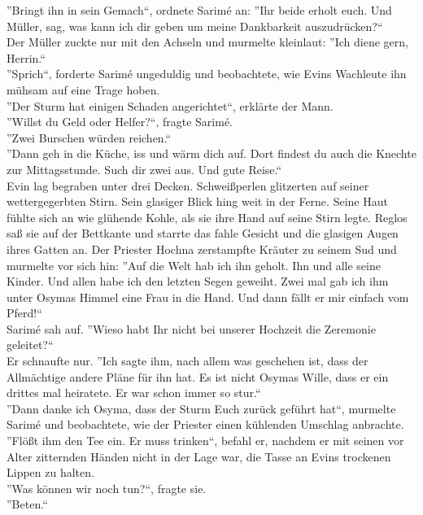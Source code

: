 ''Bringt ihn in sein Gemach``, ordnete Sarimé an: ''Ihr beide erholt euch. Und Müller, sag, was 
kann ich dir geben um meine Dankbarkeit auszudrücken?``\\
Der Müller zuckte nur mit den Achseln und murmelte kleinlaut: ''Ich diene gern, Herrin.``\\
''Sprich``, forderte Sarimé ungeduldig und beobachtete, wie Evins Wachleute ihn mühsam auf eine 
Trage hoben.\\
''Der Sturm hat einigen Schaden angerichtet``, erklärte der Mann.\\
''Willst du Geld oder Helfer?``, fragte Sarimé.\\
''Zwei Burschen würden reichen.``\\
''Dann geh in die Küche, iss und wärm dich auf. Dort findest du auch die Knechte zur Mittagsstunde. 
Such dir zwei aus. Und gute Reise.``\\

Evin lag begraben unter drei Decken. Schweißperlen glitzerten auf seiner wettergegerbten Stirn. 
Sein glasiger Blick hing weit in der Ferne. Seine Haut fühlte sich an wie glühende Kohle, als sie 
ihre Hand auf seine Stirn legte.  Reglos saß sie auf der Bettkante und starrte das fahle Gesicht und 
die glasigen Augen ihres Gatten an. Der Priester Hochna zerstampfte Kräuter zu seinem Sud und 
murmelte vor sich hin: ''Auf die Welt hab ich ihn geholt. Ihn und alle seine Kinder. Und allen 
habe ich den letzten Segen geweiht. Zwei mal gab ich ihm unter Osymas Himmel eine Frau in die Hand. 
Und dann fällt er mir einfach vom Pferd!``\\
Sarimé sah auf. ''Wieso habt Ihr nicht bei unserer Hochzeit die Zeremonie geleitet?``\\
Er schnaufte nur. ''Ich sagte ihm, nach allem was geschehen ist, dass der Allmächtige andere Pläne 
für ihn hat. Es ist nicht Osymas Wille, dass er ein drittes mal heiratete. Er war schon immer so 
stur.``\\
''Dann danke ich Osyma, dass der Sturm Euch zurück geführt hat``, murmelte Sarimé und beobachtete, 
wie der Priester einen kühlenden Umschlag anbrachte. ''Flößt ihm den Tee ein. Er muss trinken``, 
befahl er, nachdem er mit seinen vor Alter zitternden Händen nicht in der Lage war, die Tasse an 
Evins trockenen Lippen zu halten.\\
''Was können wir noch tun?``, fragte sie.\\
''Beten.``\\

